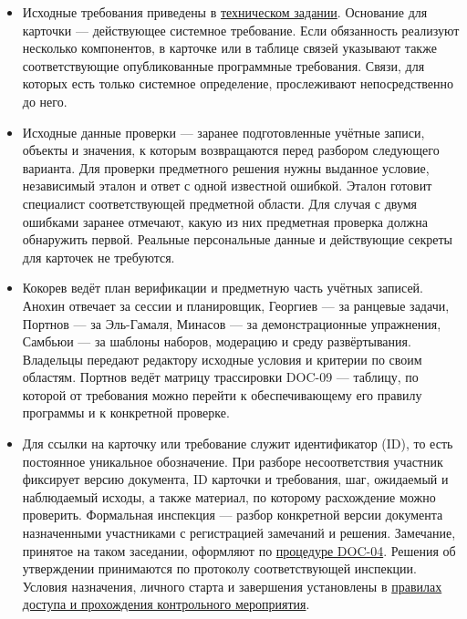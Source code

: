 \documentclass[12pt,a4paper]{article}
\newcommand{\tightlist}{\setlength{\itemsep}{0pt}\setlength{\parskip}{0pt}}
\begin{document}
\begin{itemize}
\tightlist
\item
  Исходные требования приведены в {\href{../02\_Техническое\_задание/DOC-02\_Техническое\_задание.pdf\#doc-02-техническое-задание}{техническом задании}}. Основание для карточки --- действующее системное требование. Если обязанность реализуют несколько компонентов, в карточке или в таблице связей указывают также соответствующие опубликованные программные требования. Связи, для которых есть только системное определение, прослеживают непосредственно до него.
\item
  Исходные данные проверки --- заранее подготовленные учётные записи, объекты и значения, к которым возвращаются перед разбором следующего варианта. Для проверки предметного решения нужны выданное условие, независимый эталон и ответ с одной известной ошибкой. Эталон готовит специалист соответствующей предметной области. Для случая с двумя ошибками заранее отмечают, какую из них предметная проверка должна обнаружить первой. Реальные персональные данные и действующие секреты для карточек не требуются.
\item
  Кокорев ведёт план верификации и предметную часть учётных записей. Анохин отвечает за сессии и планировщик, Георгиев --- за ранцевые задачи, Портнов --- за Эль-Гамаля, Минасов --- за демонстрационные упражнения, Самбьюи --- за шаблоны наборов, модерацию и среду развёртывания. Владельцы передают редактору исходные условия и критерии по своим областям. Портнов ведёт матрицу трассировки DOC-09 --- таблицу, по которой от требования можно перейти к обеспечивающему его правилу программы и к конкретной проверке.
\item
  Для ссылки на карточку или требование служит идентификатор (ID), то есть постоянное уникальное обозначение. При разборе несоответствия участник фиксирует версию документа, ID карточки и требования, шаг, ожидаемый и наблюдаемый исходы, а также материал, по которому расхождение можно проверить. Формальная инспекция --- разбор конкретной версии документа назначенными участниками с регистрацией замечаний и решения. Замечание, принятое на таком заседании, оформляют по {\href{../../06\_Процедура\_формальной\_инспекции/Процедура\_формальной\_инспекции.pdf}{процедуре DOC-04}}. Решения об утверждении принимаются по протоколу соответствующей инспекции. Условия назначения, личного старта и завершения установлены в {\href{../02\_Техническое\_задание/DOC-02\_Техническое\_задание.pdf\#правила-доступа-и-прохождения-контрольного-мероприятия}{правилах доступа и прохождения контрольного мероприятия}}.
\end{itemize}
\end{document}
